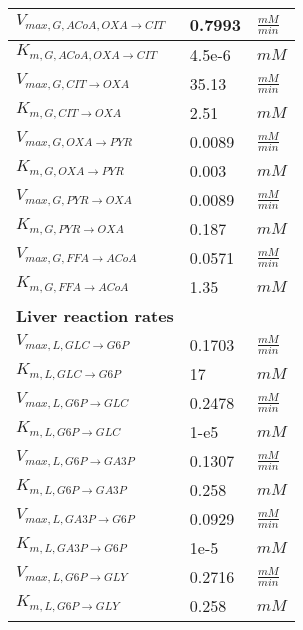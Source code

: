 \begin{supertabular}{lll}
$V_{max, G,ACoA , OXA \xrightarrow[]{} CIT}$ & 0.7993 & $\frac{mM}{min}$       \\ \hline
$K_{m, G,ACoA , OXA \xrightarrow[]{} CIT}$ & 4.5e-6 & $mM$   \\ \hline

$V_{max, G,CIT \xrightarrow[]{} OXA}$ & 35.13 & $\frac{mM}{min}$       \\ 
$K_{m, G,CIT \xrightarrow[]{} OXA}$ & 2.51 & $mM$   \\ \hline

$V_{max, G,OXA \xrightarrow[]{} PYR}$ & 0.0089 & $\frac{mM}{min}$       \\ \hline
$K_{m, G,OXA \xrightarrow[]{} PYR}$ & 0.003 & $mM$   \\ \hline

$V_{max, G,PYR \xrightarrow[]{} OXA}$ & 0.0089 & $\frac{mM}{min}$       \\ \hline
$K_{m, G,PYR \xrightarrow[]{} OXA}$ & 0.187 & $mM$   \\ \hline

$V_{max, G,FFA \xrightarrow[]{} ACoA}$ & 0.0571 & $\frac{mM}{min}$       \\ \hline
$K_{m, G,FFA \xrightarrow[]{} ACoA}$ & 1.35 & $mM$   \\ \hline

\textbf{Liver reaction rates} \\ \hline
$V_{max, L,GLC \xrightarrow[]{} G6P}$ & 0.1703 & $\frac{mM}{min}$       \\ \hline
$K_{m, L,GLC \xrightarrow[]{} G6P}$ & 17 & $mM$   \\ \hline

$V_{max, L,G6P \xrightarrow[]{} GLC}$ & 0.2478 & $\frac{mM}{min}$       \\ \hline
$K_{m, L,G6P \xrightarrow[]{} GLC}$ & 1-e5 & $mM$   \\ \hline

$V_{max, L,G6P \xrightarrow[]{} GA3P}$ & 0.1307 & $\frac{mM}{min}$       \\ \hline
$K_{m, L,G6P \xrightarrow[]{} GA3P}$ & 0.258 & $mM$   \\ \hline

$V_{max, L,GA3P \xrightarrow[]{} G6P}$ & 0.0929 & $\frac{mM}{min}$       \\ \hline
$K_{m, L,GA3P \xrightarrow[]{} G6P}$ & 1e-5 & $mM$   \\ \hline

$V_{max, L,G6P \xrightarrow[]{} GLY}$ & 0.2716 & $\frac{mM}{min}$       \\ \hline
$K_{m, L,G6P \xrightarrow[]{} GLY}$ & 0.258 & $mM$   \\ \hline


\end{supertabular}
